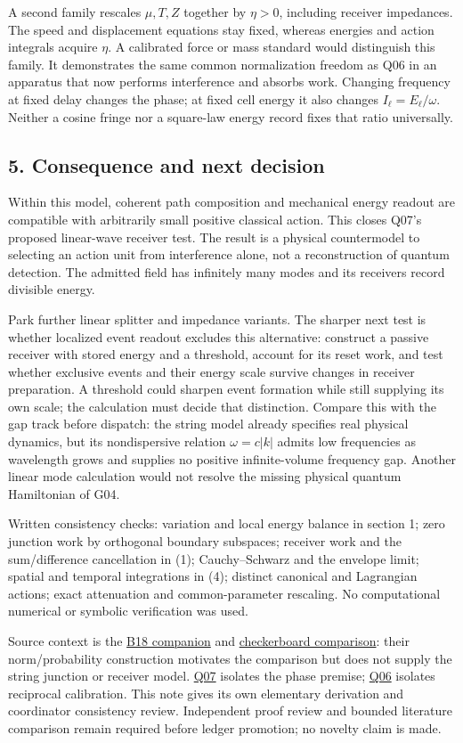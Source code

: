 \documentclass[11pt,a4paper]{article}
\begin{document}
A second family rescales \(\mu,T,Z\) together by \(\eta>0\), including
receiver impedances. The speed and displacement equations stay fixed,
whereas energies and action integrals acquire \(\eta\). A calibrated
force or mass standard would distinguish this family. It demonstrates
the same common normalization freedom as Q06 in an apparatus that now
performs interference and absorbs work. Changing frequency at fixed
delay changes the phase; at fixed cell energy it also changes
\(I_\ell=E_\ell/\omega\). Neither a cosine fringe nor a square-law
energy record fixes that ratio universally.

\hypertarget{consequence-and-next-decision}{%
\subsection{5. Consequence and next
decision}\label{consequence-and-next-decision}}

Within this model, coherent path composition and mechanical energy
readout are compatible with arbitrarily small positive classical action.
This closes Q07's proposed linear-wave receiver test. The result is a
physical countermodel to selecting an action unit from interference
alone, not a reconstruction of quantum detection. The admitted field has
infinitely many modes and its receivers record divisible energy.

Park further linear splitter and impedance variants. The sharper next
test is whether localized event readout excludes this alternative:
construct a passive receiver with stored energy and a threshold, account
for its reset work, and test whether exclusive events and their energy
scale survive changes in receiver preparation. A threshold could sharpen
event formation while still supplying its own scale; the calculation
must decide that distinction. Compare this with the gap track before
dispatch: the string model already specifies real physical dynamics, but
its nondispersive relation \(\omega=c|k|\) admits low frequencies as
wavelength grows and supplies no positive infinite-volume frequency gap.
Another linear mode calculation would not resolve the missing physical
quantum Hamiltonian of G04.

Written consistency checks: variation and local energy balance in
section 1; zero junction work by orthogonal boundary subspaces; receiver
work and the sum/difference cancellation in (1); Cauchy--Schwarz and the
envelope limit; spatial and temporal integrations in (4); distinct
canonical and Lagrangian actions; exact attenuation and common-parameter
rescaling. No computational numerical or symbolic verification was used.

Source context is the
\href{../docs/batches/B18/checkerboard-recurrence-source-companion.md}{B18
companion} and \href{checkerboard-dynamics.md}{checkerboard comparison}:
their norm/probability construction motivates the comparison but does
not supply the string junction or receiver model.
\href{spin-action-patching.md}{Q07} isolates the phase premise;
\href{reciprocal-coupling-normalization.md}{Q06} isolates reciprocal
calibration. This note gives its own elementary derivation and
coordinator consistency review. Independent proof review and bounded
literature comparison remain required before ledger promotion; no
novelty claim is made.
\end{document}
